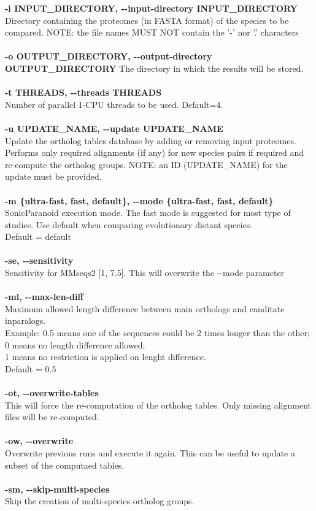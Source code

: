\documentclass[12pt]{article} %
\begin{document}
\begin{mdframed}[backgroundcolor=white!20]
\textbf{-i INPUT\_DIRECTORY, \--\--input-directory INPUT\_DIRECTORY}\\
Directory containing the proteomes (in FASTA format) of the species to be compared. NOTE: the file names MUST NOT contain the '-' nor '.' characters\\\\
\textbf{-o OUTPUT\_DIRECTORY, \--\--output-directory OUTPUT\_DIRECTORY}\newline
The directory in which the results will be stored.\\\\
\textbf{-t THREADS, \--\--threads THREADS}\\
Number of parallel 1-CPU threads to be used. Default=4.\\\\
\textbf{-u UPDATE\_NAME, \--\--update UPDATE\_NAME}\\
Update the ortholog tables database by adding or removing input proteomes. Performs only required alignments (if any) for new species pairs if required and re-compute the ortholog groups. NOTE: an ID (UPDATE\_NAME) for the update must be provided.\\\\
\textbf{-m \{ultra-fast, fast, default\}, \--\--mode \{ultra-fast, fast, default\} }\\
SonicParanoid execution mode. The fast mode is suggested for most type of studies. Use default when comparing evolutionary distant species.\\Default = default\\\\
\textbf{-se, \--\--sensitivity}\\
Sensitivity for MMseqs2 [1, 7.5]. This will overwrite the \--\--mode parameter\\\\
\textbf{-ml, \--\--max-len-diff}\\
Maximum allowed length difference between main orthologs and canditate inparalogs.\\
Example: 0.5 means one of the sequences could be 2 times longer than the other;\\
0 means no length difference allowed;\\
1 means no restriction is applied on lenght difference.\\
Default = 0.5\\\\
\textbf{-ot, \--\--overwrite-tables}\\
This will force the re-computation of the ortholog tables. Only missing alignment files will be re-computed.\\\\
\textbf{-ow, \--\--overwrite}\\
Overwrite previous runs and execute it again. This can be useful to update a subset of the computaed tables.\\\\
\textbf{-sm, \--\--skip-multi-species }\\
Skip the creation of multi-species ortholog groups.
\end{mdframed}
\end{document}
